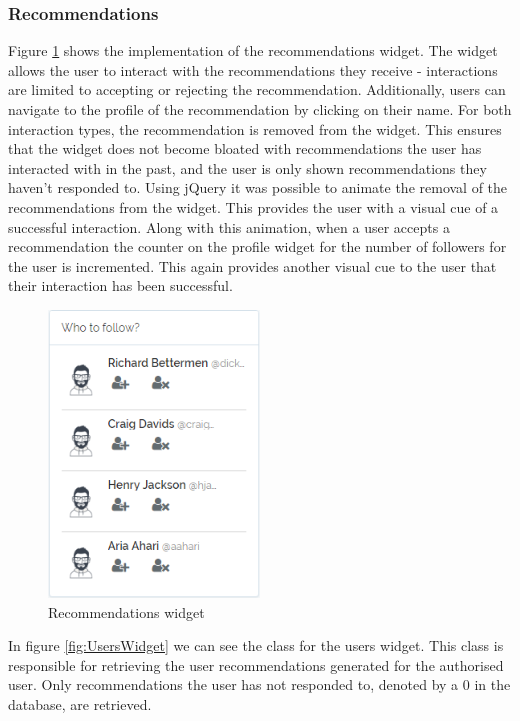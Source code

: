 \subsubsection{Recommendations}
Figure \ref{fig:RecommendationsWidget} shows the implementation of the recommendations widget. The widget allows the user to interact with the recommendations they receive - interactions are limited to accepting or rejecting the recommendation. Additionally, users can navigate to the profile of the recommendation by clicking on their name. For both interaction types, the recommendation is removed from the widget. This ensures that the widget does not become bloated with recommendations the user has interacted with in the past, and the user is only shown recommendations they haven't responded to. Using jQuery it was possible to animate the removal of the recommendations from the widget. This provides the user with a visual cue of a successful interaction. Along with this animation, when a user accepts a recommendation the counter on the profile widget for the number of followers for the user is incremented. This again provides another visual cue to the user that their  interaction has been successful.

\begin{figure}[H]
\centering
\includegraphics[height=3in]{Images/Implementation/RecommendationsWidget}
\caption{Recommendations widget}
\label{fig:RecommendationsWidget}
\end{figure}

In figure \ref{fig:UsersWidget} we can see the class for the users widget. This class is responsible for retrieving the user recommendations generated for the authorised user. Only recommendations the user has not responded to, denoted by a 0 in the database, are retrieved. 

